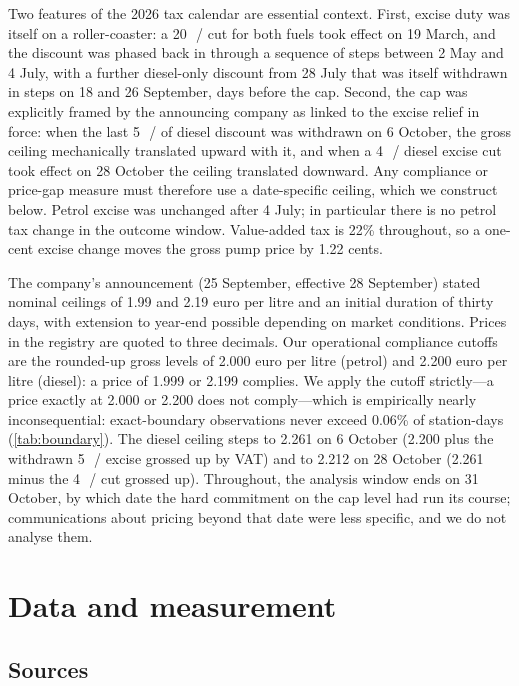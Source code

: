 \documentclass[11pt]{article}
\newcommand{\cl}{\,\text{c}/\text{l}}
\begin{document}
Two features of the 2026 tax calendar are essential context. First, excise
duty was itself on a roller-coaster: a 20~\cl{} cut for both fuels took
effect on 19 March, and the discount was phased back in through a sequence
of steps between 2 May and 4 July, with a further diesel-only discount
from 28 July that was itself withdrawn in steps on 18 and 26 September,
days before the cap. Second, the cap was explicitly framed by the
announcing company as linked to the excise relief in force: when the last
5~\cl{} of diesel discount was withdrawn on 6 October, the gross ceiling
mechanically translated upward with it, and when a 4~\cl{} diesel excise
cut took effect on 28 October the ceiling translated downward. Any
compliance or price-gap measure must therefore use a date-specific
ceiling, which we construct below. Petrol excise was unchanged after
4 July; in particular there is no petrol tax change in the outcome window.
Value-added tax is 22\% throughout, so a one-cent excise change moves the
gross pump price by 1.22 cents.

The company's announcement (25 September, effective 28 September) stated
nominal ceilings of 1.99 and 2.19 euro per litre and an initial
duration of
thirty days, with extension to year-end possible depending on market
conditions. Prices in the registry are quoted to three decimals. Our
operational compliance cutoffs are the rounded-up gross levels of
2.000 euro per litre (petrol) and 2.200 euro per litre (diesel): a
price of 1.999 or
2.199 complies. We apply the cutoff strictly---a price exactly at
2.000 or 2.200 does not comply---which is empirically nearly inconsequential:
exact-boundary observations never exceed 0.06\% of station-days
(\cref{tab:boundary}). The diesel ceiling steps to 2.261 on 6 October
(2.200 plus the withdrawn 5~\cl{} excise grossed up by VAT) and to 2.212
on 28 October (2.261 minus the 4~\cl{} cut grossed up). Throughout, the
analysis window ends on 31 October, by which date the hard commitment on
the cap level had run its course; communications about pricing beyond that
date were less specific, and we do not analyse them.

\section{Data and measurement}\label{sec:data}

\subsection{Sources}
\end{document}
